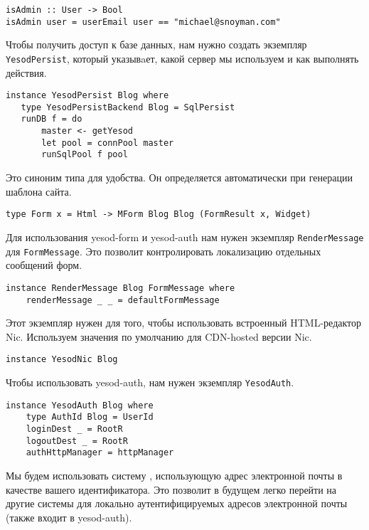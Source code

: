 \begin{lstlisting}
isAdmin :: User -> Bool
isAdmin user = userEmail user == "michael@snoyman.com"
\end{lstlisting}
 
Чтобы получить доступ к базе данных, нам нужно создать экземпляр \lstinline!YesodPersist!, который указывaет, какой сервер мы используем и как выполнять действия. 
 
\begin{lstlisting}
instance YesodPersist Blog where
   type YesodPersistBackend Blog = SqlPersist
   runDB f = do 
       master <- getYesod
       let pool = connPool master
       runSqlPool f pool
\end{lstlisting}
 
Это синоним типа для удобства. Он определяется автоматически при генерации шаблона сайта. 
 
\begin{lstlisting}
type Form x = Html -> MForm Blog Blog (FormResult x, Widget)
\end{lstlisting}
 
Для использования yesod-form и yesod-auth нам нужен экземпляр \lstinline!RenderMessage! для \lstinline!FormMessage!. Это позволит контролировать локализацию отдельных сообщений форм. 
 
\begin{lstlisting}
instance RenderMessage Blog FormMessage where
    renderMessage _ _ = defaultFormMessage
\end{lstlisting}
 
Этот экземпляр нужен для того, чтобы использовать встроенный HTML-редактор Nic. Используем значения по умолчанию для CDN-hosted версии Nic.
 
\begin{lstlisting}
instance YesodNic Blog
\end{lstlisting}
 
Чтобы использовать yesod-auth, нам нужен экземпляр \lstinline!YesodAuth!. 
 
\begin{lstlisting}
instance YesodAuth Blog where
    type AuthId Blog = UserId
    loginDest _ = RootR
    logoutDest _ = RootR
    authHttpManager = httpManager
\end{lstlisting}

Мы будем использовать систему , использующую адрес электронной почты в качестве вашего идентификатора. Это позволит в будущем легко перейти на другие системы для локально аутентифицируемых адресов электронной почты (также входит в yesod-auth).
 
